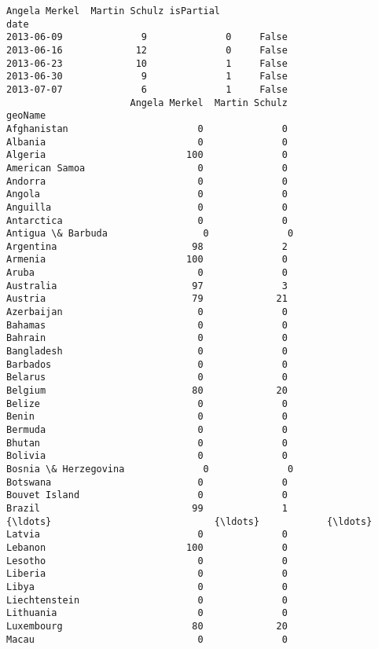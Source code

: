 \documentclass[11pt]{article}
\begin{document}
    \begin{Verbatim}[commandchars=\\\{\}]
            Angela Merkel  Martin Schulz isPartial
date                                              
2013-06-09              9              0     False
2013-06-16             12              0     False
2013-06-23             10              1     False
2013-06-30              9              1     False
2013-07-07              6              1     False
                      Angela Merkel  Martin Schulz
geoName                                           
Afghanistan                       0              0
Albania                           0              0
Algeria                         100              0
American Samoa                    0              0
Andorra                           0              0
Angola                            0              0
Anguilla                          0              0
Antarctica                        0              0
Antigua \& Barbuda                 0              0
Argentina                        98              2
Armenia                         100              0
Aruba                             0              0
Australia                        97              3
Austria                          79             21
Azerbaijan                        0              0
Bahamas                           0              0
Bahrain                           0              0
Bangladesh                        0              0
Barbados                          0              0
Belarus                           0              0
Belgium                          80             20
Belize                            0              0
Benin                             0              0
Bermuda                           0              0
Bhutan                            0              0
Bolivia                           0              0
Bosnia \& Herzegovina              0              0
Botswana                          0              0
Bouvet Island                     0              0
Brazil                           99              1
{\ldots}                             {\ldots}            {\ldots}
Latvia                            0              0
Lebanon                         100              0
Lesotho                           0              0
Liberia                           0              0
Libya                             0              0
Liechtenstein                     0              0
Lithuania                         0              0
Luxembourg                       80             20
Macau                             0              0

\end{Verbatim}
\end{document}
